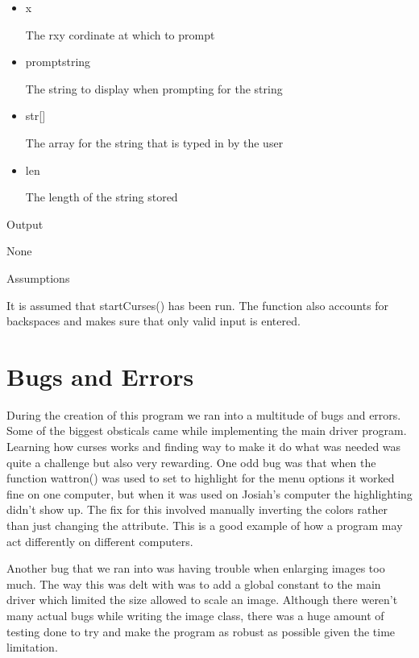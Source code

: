\documentclass[pdftex, 11pt]{article}
\begin{document}
\begin{description}
\begin{description}
\begin{itemize}
						The y cordinate at which to prompt

					\item{x}

						The rxy cordinate at which to prompt

					\item{promptstring}

						The string to display when prompting
						for the string

					\item{str[]}

						The array for the string that is typed
						in by the user

					\item{len}

						The length of the string stored

				\end{itemize}

			\item{Output}

				None

			\item{Assumptions}

				It is assumed that startCurses() has been run.
				The function also accounts for backspaces and
				makes sure that only valid input is entered.

		\end{description}


\end{description}

\section{Bugs and Errors}

	During the creation of this program we ran into a multitude of bugs and errors.  Some of the biggest obsticals came
while implementing the main driver program.  Learning how curses works and finding way to make it do what was needed was
quite a challenge but also very rewarding.  One odd bug was that when the function wattron() was used to set to
highlight for the menu options it worked fine on one computer, but when it was used on Josiah's computer the
highlighting didn't show up.  The fix for this involved manually inverting the colors rather than just changing the
attribute.  This is a good example of how a program may act differently on different computers.

Another bug that we ran into was having trouble when enlarging images too much.  The way this was delt with was to add a
global constant to the main driver which limited the size allowed to scale an image.  Although there weren't many actual
bugs while writing the image class, there was a huge amount of testing done to try and make the program as robust as
possible given the time limitation.
\end{document}
